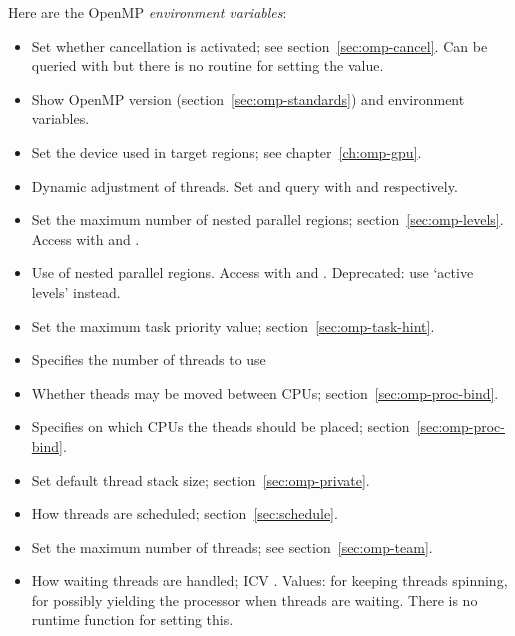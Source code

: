 Here are the OpenMP \emph{environment variables}:
\begin{itemize}
\item {} Set whether cancellation is activated;
  see section~\ref{sec:omp-cancel}.
  Can be queried with  but there is no
  routine for setting the value.
\item {} Show OpenMP version (section~\ref{sec:omp-standards})
  and environment variables.
\item {} Set the device used in target regions;
  see chapter~\ref{ch:omp-gpu}.
\item {} Dynamic adjustment of threads.
  Set and query with   and 
  respectively.
\item {} Set the maximum number of nested parallel
  regions; section~\ref{sec:omp-levels}.
  Access with   and
  .
\item {} Use of nested parallel regions.
  Access with  and .
  Deprecated: use `active levels' instead.
\item {} Set the maximum task priority value;
  section~\ref{sec:omp-task-hint}.
\item {} Specifies the number of threads to use
\item {} Whether theads may be moved between CPUs;
  section~\ref{sec:omp-proc-bind}.
\item {} Specifies on which CPUs the theads should be placed;
  section~\ref{sec:omp-proc-bind}.
\item {} Set default thread stack size;
  section~\ref{sec:omp-private}.
\item {} How threads are scheduled;
  section~\ref{sec:schedule}.
\item {} Set the maximum number of threads;
  see section~\ref{sec:omp-team}.
\item {} How waiting threads are
  handled; \ac{ICV} . Values:
   for keeping threads spinning,  for possibly
  yielding the processor when threads are waiting.
  There is no runtime function for setting this.
\end{itemize}

